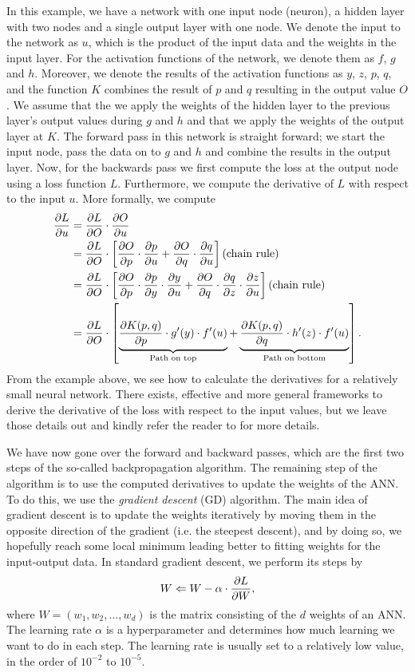 In this example, we have a network with one input node (neuron), a hidden layer with two nodes and a single output layer with one node. We denote the input to the network as $u$, which is the product of the input data and the weights in the input layer. For the activation functions of the network, we denote them as $f$, $g$ and $h$. Moreover, we denote the results of the activation functions as $y$, $z$, $p$, $q$, and the function $K$ combines the result of $p$ and $q$ resulting in the output value $O$. We assume that the we apply the weights of the hidden layer to the previous layer's output values during $g$ and $h$ and that we apply the weights of the output layer at $K$. The forward pass in this network is straight forward; we start the input node, pass the data on to $g$ and $h$ and combine the results in the output layer. Now, for the backwards pass we first compute the loss at the output node using a loss function $L$. Furthermore, we compute the derivative of $L$ with respect to the input $u$. More formally, we compute
\begin{align}
    \parder{L}{u}
    &= \parder{L}{O} \cdot \parder{O}{u} \\
    &= \parder{L}{O} \cdot \left[
    \parder{O}{p} \cdot \parder{p}{u} +
    \parder{O}{q} \cdot \parder{q}{u}
    \right] \text{(chain rule)} \\
    &= \parder{L}{O} \cdot \left[
    \parder{O}{p} \cdot \parder{p}{y} \cdot \parder{y}{u} + 
    \parder{O}{q} \cdot \parder{q}{z} \cdot \parder{z}{u}
    \right] \text{(chain rule)} \\
    &= \parder{L}{O} \cdot \left[
    \undertext{\parder{K(p, q)}{p} \cdot g'(y) \cdot f'(u)}{Path on top} + 
    \undertext{\parder{K(p, q)}{q} \cdot h'(z) \cdot f'(u)}{Path on bottom}
    \right].
\end{align}
From the example above, we see how to calculate the derivatives for a relatively small neural network. There exists, effective and more general frameworks to derive the derivative of the loss with respect to the input values, but we leave those details out and kindly refer the reader to \cite[Chapter 1.3]{Aggarwal18} for more details.

We have now gone over the forward and backward passes, which are the first two steps of the so-called backpropagation algorithm. The remaining step of the algorithm is to use the computed derivatives to update the weights of the ANN. To do this, we use the \textit{gradient descent} (GD) algorithm. The main idea of gradient descent is to update the weights iteratively by moving them in the opposite direction of the gradient (i.e. the steepest descent), and by doing so, we hopefully reach some local minimum leading better to fitting weights for the input-output data. In standard gradient descent, we perform its steps by
\begin{align}
    W \Leftarrow W - \alpha \cdot \frac{\partial L}{\partial W},
\end{align}
where $W = \left( w_1, w_2, \ldots, w_d \right)$ is the matrix consisting of the $d$ weights of an ANN. The learning rate $\alpha$ is a hyperparameter and determines how much learning we want to do in each step. The learning rate is usually set to a relatively low value, in the order of $10^{-2}$ to $10^{-5}$.

